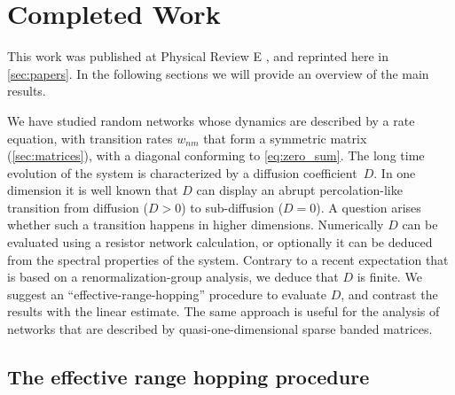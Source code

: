 \chapter{Completed Work}


This work was published at Physical Review E \cite{de_leeuw_diffusion_2012},
and reprinted here in \autoref{sec:papers}. In the
following sections we will provide an overview
of the main results.









We have studied random networks whose dynamics are
described by a rate equation, with transition rates $w_{nm}$
that form a symmetric matrix (\autoref{sec:matrices}),
with a diagonal conforming to \autoref{eq:zero_sum}. 
%
The long time evolution
of the system is characterized by a diffusion coefficient~$D$.
In one dimension it is well known that $D$ can display an abrupt
percolation-like transition from diffusion (${D>0}$)
to sub-diffusion (${D=0}$). 
%
A question arises whether
such a transition happens in higher dimensions.
Numerically $D$ can be evaluated using a resistor network
calculation, or optionally it can be deduced from 
the spectral properties of the system. Contrary to a recent 
expectation that is based on a renormalization-group analysis, 
we deduce that $D$ is finite.
%
We suggest an ``effective-range-hopping'' procedure to evaluate $D$,
and contrast the results with the linear estimate.
The same approach is useful for the analysis of 
networks that are described by quasi-one-dimensional  
sparse banded matrices. 


\section{The effective range hopping procedure}


